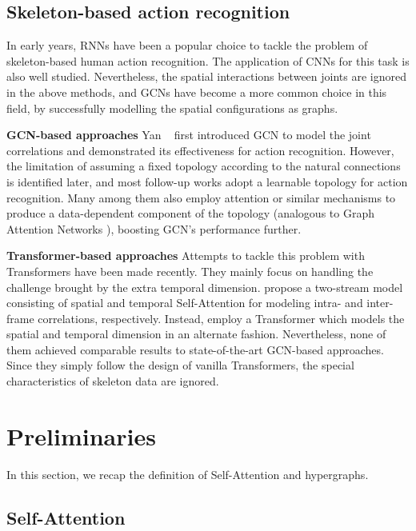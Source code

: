 \documentclass[10pt,twocolumn,letterpaper]{article}
\begin{document}
\subsection{Skeleton-based action recognition}
In early years, RNNs \cite{du2015hierarchical, song2017end,zhang2017view}
have been a popular choice to tackle the problem of skeleton-based human action recognition.
The application of CNNs for this task 
\cite{ke2017a, liu2017enhanced}
is also well studied.  
Nevertheless, the spatial interactions between joints are ignored in the above methods, 
and GCNs have become a more common choice in this field, by successfully modelling the spatial configurations
as graphs. 

\textbf{GCN-based approaches}  Yan \etal~\cite{yan2018spatial} first introduced GCN \cite{kipf2016semi} to model the joint correlations and demonstrated its effectiveness for action recognition. However, 
the limitation of assuming a fixed topology according to the natural connections is identified later, and most follow-up works adopt a learnable topology for action recognition.
Many among them \cite{cheng2020decoupling, shi2019two, chen2021channel, ye2020dynamic} also employ attention or similar mechanisms to produce a data-dependent component of the  
topology (analogous to Graph Attention Networks \cite{velivckovic2017graph}), boosting GCN's performance further.

\textbf{Transformer-based approaches}
Attempts to tackle this problem with Transformers have been made recently.
They mainly focus on handling the challenge brought by the extra temporal dimension. 
\cite{plizzari2021spatial} propose a two-stream model consisting of spatial and temporal Self-Attention for modeling intra- and inter-frame correlations, respectively. Instead, \cite{shi2020decoupled} employ a Transformer which models the spatial and temporal dimension in an alternate fashion. 
Nevertheless, none of them achieved comparable results to state-of-the-art GCN-based approaches. Since they simply follow the design of vanilla Transformers, the special characteristics of skeleton data are ignored.

\section{Preliminaries}
In this section, we recap the definition of Self-Attention and hypergraphs.

\subsection{Self-Attention}
\end{document}
